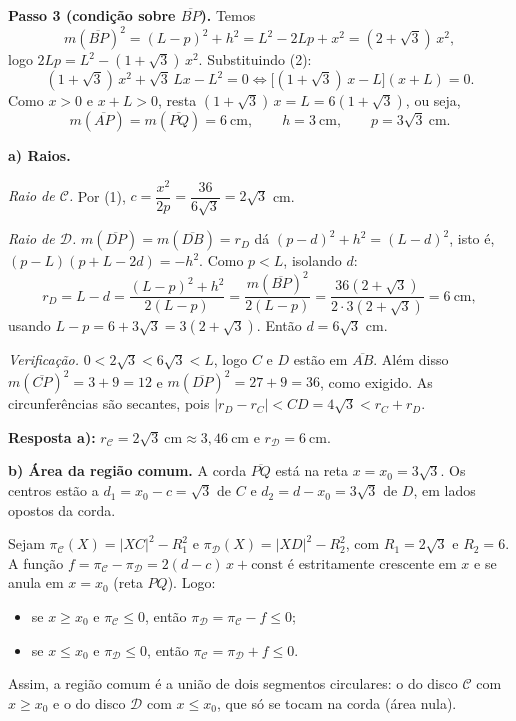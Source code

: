 \documentclass{article}%
\begin{document}
\textbf{Passo 3 (condição sobre $\overline{BP}$).} Temos
$$m(\overline{BP})^2=(L-p)^2+h^2=L^2-2Lp+x^2=(2+\sqrt{3})\,x^2,$$
logo $2Lp=L^2-(1+\sqrt{3})\,x^2$. Substituindo (2):
$$(1+\sqrt{3})\,x^2+\sqrt{3}\,Lx-L^2=0\iff\big[(1+\sqrt{3})\,x-L\big](x+L)=0.$$
Como $x>0$ e $x+L>0$, resta $(1+\sqrt{3})\,x=L=6(1+\sqrt{3})$, ou seja,
$$m(\overline{AP})=m(\overline{PQ})=6\ \text{cm},\qquad h=3\ \text{cm},\qquad p=3\sqrt{3}\ \text{cm}.$$

\textbf{a) Raios.}

\emph{Raio de $\mathcal{C}$.} Por (1), $c=\dfrac{x^2}{2p}=\dfrac{36}{6\sqrt{3}}=2\sqrt{3}$ cm.

\emph{Raio de $\mathcal{D}$.} $m(\overline{DP})=m(\overline{DB})=r_D$ dá $(p-d)^2+h^2=(L-d)^2$, isto é, $(p-L)(p+L-2d)=-h^2$. Como $p<L$, isolando $d$:
$$r_D=L-d=\frac{(L-p)^2+h^2}{2(L-p)}=\frac{m(\overline{BP})^2}{2(L-p)}=\frac{36(2+\sqrt{3})}{2\cdot 3(2+\sqrt{3})}=6\ \text{cm},$$
usando $L-p=6+3\sqrt{3}=3(2+\sqrt{3})$. Então $d=6\sqrt{3}$ cm.

\emph{Verificação.} $0<2\sqrt{3}<6\sqrt{3}<L$, logo $C$ e $D$ estão em $\overline{AB}$. Além disso $m(\overline{CP})^2=3+9=12$ e $m(\overline{DP})^2=27+9=36$, como exigido. As circunferências são secantes, pois $|r_D-r_C|<CD=4\sqrt{3}<r_C+r_D$.

\textbf{Resposta a):} $r_{\mathcal{C}}=2\sqrt{3}\ \text{cm}\approx 3{,}46\ \text{cm}$ e $r_{\mathcal{D}}=6\ \text{cm}$.

\textbf{b) Área da região comum.} A corda $\overline{PQ}$ está na reta $x=x_0=3\sqrt{3}$. Os centros estão a $d_1=x_0-c=\sqrt{3}$ de $C$ e $d_2=d-x_0=3\sqrt{3}$ de $D$, em lados opostos da corda.

Sejam $\pi_{\mathcal{C}}(X)=|XC|^2-R_1^2$ e $\pi_{\mathcal{D}}(X)=|XD|^2-R_2^2$, com $R_1=2\sqrt{3}$ e $R_2=6$. A função $f=\pi_{\mathcal{C}}-\pi_{\mathcal{D}}=2(d-c)\,x+\text{const}$ é estritamente crescente em $x$ e se anula em $x=x_0$ (reta $PQ$). Logo:
\begin{itemize}
  \item se $x\ge x_0$ e $\pi_{\mathcal{C}}\le 0$, então $\pi_{\mathcal{D}}=\pi_{\mathcal{C}}-f\le 0$;
  \item se $x\le x_0$ e $\pi_{\mathcal{D}}\le 0$, então $\pi_{\mathcal{C}}=\pi_{\mathcal{D}}+f\le 0$.
\end{itemize}
Assim, a região comum é a união de dois segmentos circulares: o do disco $\mathcal{C}$ com $x\ge x_0$ e o do disco $\mathcal{D}$ com $x\le x_0$, que só se tocam na corda (área nula).
\end{document}
